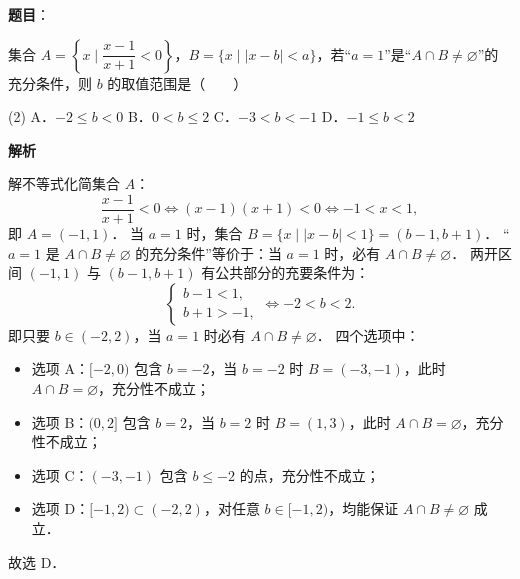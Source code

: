 \begin{answer}

\textbf{题目}：

集合 $A = \left\{x \mid \dfrac{x - 1}{x + 1} < 0\right\}$，$B = \{x \mid |x - b| < a\}$，若“$a = 1$”是“$A \cap B \neq \varnothing$”的充分条件，则 $b$ 的取值范围是\mbox{（　　）}

\begin{gkopts}(2)
\task A．$-2 \leqslant b < 0$
\task B．$0 < b \leqslant 2$
\task C．$-3 < b < -1$
\task D．$-1 \leqslant b < 2$
\end{gkopts}

\textbf{解析}

解不等式化简集合 $A$：
\nopagebreak[4]
\[
\frac{x - 1}{x + 1} < 0 \iff (x - 1)(x + 1) < 0 \iff -1 < x < 1,
\]
即 $A = (-1, 1)$．
当 $a = 1$ 时，集合 $B = \{x \mid |x - b| < 1\} = (b - 1, b + 1)$．
“$a = 1$ 是 $A \cap B \neq \varnothing$ 的充分条件”等价于：当 $a = 1$ 时，必有 $A \cap B \neq \varnothing$．
两开区间 $(-1, 1)$ 与 $(b - 1, b + 1)$ 有公共部分的充要条件为：
\nopagebreak[4]
\[
\begin{cases}
b - 1 < 1, \\
b + 1 > -1,
\end{cases}
\iff -2 < b < 2.
\]
即只要 $b \in (-2, 2)$，当 $a = 1$ 时必有 $A \cap B \neq \varnothing$．
四个选项中：
\begin{itemize}
\item 选项 A：$[-2, 0)$ 包含 $b = -2$，当 $b = -2$ 时 $B = (-3, -1)$，此时 $A \cap B = \varnothing$，充分性不成立；
\item 选项 B：$(0, 2]$ 包含 $b = 2$，当 $b = 2$ 时 $B = (1, 3)$，此时 $A \cap B = \varnothing$，充分性不成立；
\item 选项 C：$(-3, -1)$ 包含 $b \leqslant -2$ 的点，充分性不成立；
\item 选项 D：$[-1, 2) \subset (-2, 2)$，对任意 $b \in [-1, 2)$，均能保证 $A \cap B \neq \varnothing$ 成立．
\end{itemize}

故选 D．


\end{answer}
